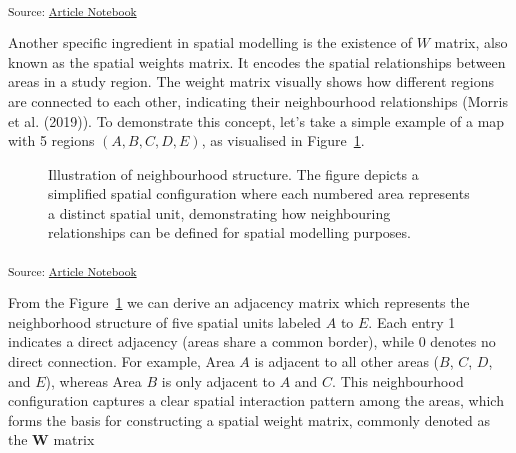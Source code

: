 \documentclass[
  default,
]{sn-jnl}
\begin{document}
\textsubscript{Source:
\href{https://indiraputeri-phd.github.io/CAR_simcomp/manuscript.qmd.html}{Article
Notebook}}

Another specific ingredient in spatial modelling is the existence of
\(W\) matrix, also known as the spatial weights matrix. It encodes the
spatial relationships between areas in a study region. The weight matrix
visually shows how different regions are connected to each other,
indicating their neighbourhood relationships (Morris et al. (2019)). To
demonstrate this concept, let's take a simple example of a map with 5
regions \((A, B, C, D, E)\), as visualised in
Figure~\ref{fig-neighsimple}.

\label{cell-fig-neighsimple}
\begin{figure}[H]


\caption{\label{fig-neighsimple}Illustration of neighbourhood structure.
The figure depicts a simplified spatial configuration where each
numbered area represents a distinct spatial unit, demonstrating how
neighbouring relationships can be defined for spatial modelling
purposes.}

\end{figure}%

\textsubscript{Source:
\href{https://indiraputeri-phd.github.io/CAR_simcomp/manuscript.qmd.html}{Article
Notebook}}

From the Figure~\ref{fig-neighsimple} we can derive an adjacency matrix
which represents the neighborhood structure of five spatial units
labeled \(A\) to \(E\). Each entry 1 indicates a direct adjacency (areas
share a common border), while 0 denotes no direct connection. For
example, Area \(A\) is adjacent to all other areas (\(B\), \(C\), \(D\),
and \(E\)), whereas Area \(B\) is only adjacent to \(A\) and \(C\). This
neighbourhood configuration captures a clear spatial interaction pattern
among the areas, which forms the basis for constructing a spatial weight
matrix, commonly denoted as the \(\mathbf{W}\) matrix
\end{document}
